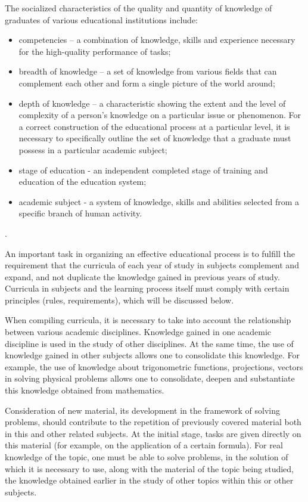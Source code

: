 \documentclass[a4paper, 10pt,twocolumn]{article}
\newcommand{\RomanNumeralCaps}[1]
    {\MakeUppercase{\romannumeral #1}}
\begin{document}
The socialized characteristics of the quality and quantity of knowledge of graduates of various educational
institutions include:
\\
\begin{itemize}
    \item competencies – a combination of knowledge, skills
and experience necessary for the high-quality performance of tasks;
    \item breadth of knowledge – a set of knowledge from
various fields that can complement each other and
form a single picture of the world around;
    \item depth of knowledge – a characteristic showing the
extent and the level of complexity of a person’s
knowledge on a particular issue or phenomenon. For
a correct construction of the educational process at a
particular level, it is necessary to specifically outline
the set of knowledge that a graduate must possess
in a particular academic subject;
    \item stage of education - an independent completed stage
of training and education of the education system;
    \item academic subject - a system of knowledge, skills
and abilities selected from a specific branch of
human activity.
\end{itemize}
\centerline{\RomanNumeralCaps{3}. }

An important task in organizing an effective educational process is to fulfill the requirement that the
curricula of each year of study in subjects complement
and expand, and not duplicate the knowledge gained
in previous years of study. Curricula in subjects and
the learning process itself must comply with certain
principles (rules, requirements), which will be discussed
below.

When compiling curricula, it is necessary to take into
account the relationship between various academic disciplines. Knowledge gained in one academic discipline is
used in the study of other disciplines. At the same time,
the use of knowledge gained in other subjects allows
one to consolidate this knowledge. For example, the use
of knowledge about trigonometric functions, projections,
vectors in solving physical problems allows one to consolidate, deepen and substantiate this knowledge obtained
from mathematics.

Consideration of new material, its development in the
framework of solving problems, should contribute to the
repetition of previously covered material both in this and
other related subjects. At the initial stage, tasks are given
directly on this material (for example, on the application
of a certain formula). For real knowledge of the topic,
one must be able to solve problems, in the solution of
which it is necessary to use, along with the material of
the topic being studied, the knowledge obtained earlier
in the study of other topics within this or other subjects.
\end{document}
